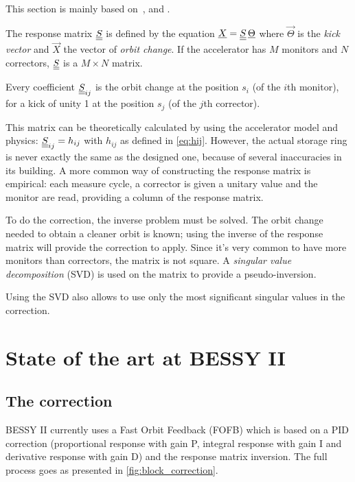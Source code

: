 This section is mainly based on~\cite{book:wille}, \cite{art:decker-1991} and \cite{art:plouviez-1999}.

The response matrix $\underline{\underline{S}}$ is defined by the equation $\underline{X} = \underline{\underline{S}}\, \underline{\Theta}$ where $\vec{\Theta}$ is the \emph{kick vector} and $\vec{X}$ the vector of \emph{orbit change}. If the accelerator has $M$ monitors and $N$ correctors, $\underline{\underline{S}}$ is a $M \times N$ matrix.

Every coefficient $\underline{\underline{S}}_{ij}$ is the orbit change at the position $s_i$ (of the $i$th monitor), for a kick of unity 1 at the position $s_j$ (of the $j$th corrector).

This matrix can be theoretically calculated by using the accelerator model and physics: $\underline{\underline{S}}_{ij} = h_{ij}$ with $h_{ij}$ as defined in \cref{eq:hij}. However, the actual storage ring is never exactly the same as the designed one, because of several inaccuracies in its building. A more common way of constructing the response matrix is empirical: each measure cycle, a corrector is given a unitary value and the monitor are read, providing a column of the response matrix.

To do the correction, the inverse problem must be solved. The orbit change needed to obtain a cleaner orbit is known; using the inverse of the response matrix will provide the correction to apply. Since it's very common to have more monitors than correctors, the matrix is not square. A \emph{singular value decomposition} (SVD) is used on the matrix to provide a pseudo-inversion.

Using the SVD also allows to use only the most significant singular values in the correction.

\section{State of the art at BESSY II}

\subsection{The correction}
BESSY II currently uses a Fast Orbit Feedback (FOFB) which is based on a PID correction (proportional response with gain P, integral response with gain I and derivative response with gain D) and the response matrix inversion. The full process goes as presented in \cref{fig:block_correction}.


